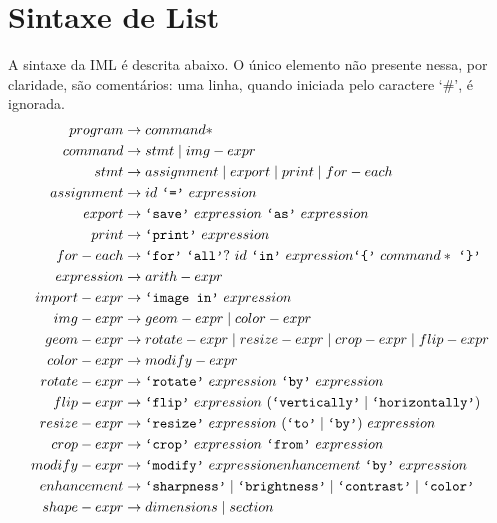 \documentclass{article}
\newcommand{\literal}[1]{\text{\texttt{`#1'}}}
\newcommand{\tsp}{\text{ }}
\begin{document}
\section{Sintaxe de List}
\label{sec:sintaxe}
A sintaxe da IML é descrita abaixo. O único elemento não presente nessa, por claridade, são comentários: uma linha, quando iniciada pelo caractere `\#', é ignorada.
\begin{align*}
program &\rightarrow command*\\
command &\rightarrow stmt \mid img-expr\\
stmt &\rightarrow assignment \mid export \mid print \mid for-each\\
assignment &\rightarrow id \tsp \literal{=} \tsp expression\\
export &\rightarrow \literal{save} \tsp expression \tsp \literal{as} \tsp expression\\
print &\rightarrow \literal{print} \tsp expression\\
for-each &\rightarrow \literal{for} \tsp \literal{all}? \tsp id \tsp \literal{in} \tsp expression \literal{\{} \tsp command* \tsp \literal{\}}\\
expression &\rightarrow arith-expr\\
import-expr &\rightarrow \literal{image in} \tsp expression\\
img-expr &\rightarrow geom-expr \mid color-expr\\
geom-expr &\rightarrow rotate-expr \mid resize-expr \mid crop-expr \mid flip-expr\\
color-expr &\rightarrow modify-expr\\
rotate-expr &\rightarrow \literal{rotate} \tsp expression \tsp \literal{by} \tsp expression\\
flip-expr &\rightarrow \literal{flip} \tsp expression \tsp (\literal{vertically} \mid \literal{horizontally})\\
resize-expr &\rightarrow \literal{resize} \tsp expression \tsp (\literal{to} \mid \literal{by}) \tsp expression\\
crop-expr &\rightarrow \literal{crop} \tsp expression \tsp \literal{from} \tsp expression\\
modify-expr &\rightarrow \literal{modify} \tsp expression enhancement \tsp \literal{by} \tsp expression\\
enhancement &\rightarrow \literal{sharpness} \mid \literal{brightness} \mid \literal{contrast} \mid \literal{color}\\
shape-expr &\rightarrow dimensions \mid section\\

\end{align*}
\end{document}
